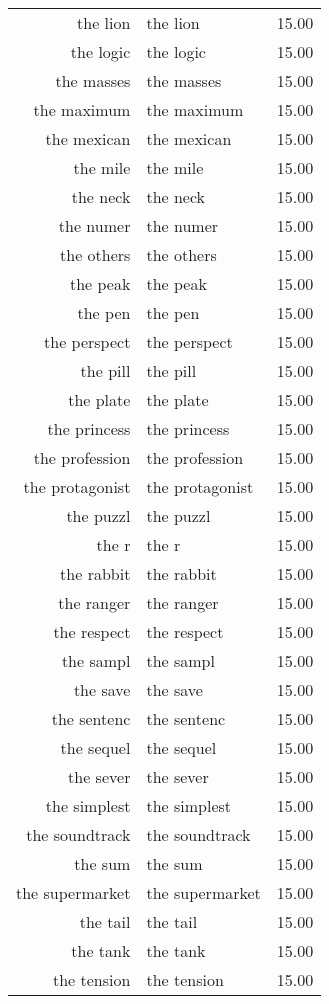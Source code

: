 \begin{table}[ht]
\begin{tabular}{rlr}
  the lion & the lion & 15.00 \\ 
  the logic & the logic & 15.00 \\ 
  the masses & the masses & 15.00 \\ 
  the maximum & the maximum & 15.00 \\ 
  the mexican & the mexican & 15.00 \\ 
  the mile & the mile & 15.00 \\ 
  the neck & the neck & 15.00 \\ 
  the numer & the numer & 15.00 \\ 
  the others & the others & 15.00 \\ 
  the peak & the peak & 15.00 \\ 
  the pen & the pen & 15.00 \\ 
  the perspect & the perspect & 15.00 \\ 
  the pill & the pill & 15.00 \\ 
  the plate & the plate & 15.00 \\ 
  the princess & the princess & 15.00 \\ 
  the profession & the profession & 15.00 \\ 
  the protagonist & the protagonist & 15.00 \\ 
  the puzzl & the puzzl & 15.00 \\ 
  the r & the r & 15.00 \\ 
  the rabbit & the rabbit & 15.00 \\ 
  the ranger & the ranger & 15.00 \\ 
  the respect & the respect & 15.00 \\ 
  the sampl & the sampl & 15.00 \\ 
  the save & the save & 15.00 \\ 
  the sentenc & the sentenc & 15.00 \\ 
  the sequel & the sequel & 15.00 \\ 
  the sever & the sever & 15.00 \\ 
  the simplest & the simplest & 15.00 \\ 
  the soundtrack & the soundtrack & 15.00 \\ 
  the sum & the sum & 15.00 \\ 
  the supermarket & the supermarket & 15.00 \\ 
  the tail & the tail & 15.00 \\ 
  the tank & the tank & 15.00 \\ 
  the tension & the tension & 15.00 \\ 

\end{tabular}
\end{table}
